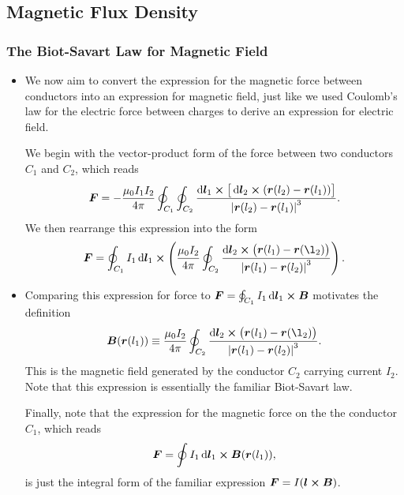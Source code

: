 \documentclass[11pt, a4paper]{article}
\newcommand{\diff}{\mathop{}\!\mathrm{d}} %
\renewcommand{\vec}[1]{\bm{#1}} %
\renewcommand{\r}{\vec{r}}
\newcommand{\B}{\vec{B}} %
\newcommand{\mm}{\mu_{0}}  %
\begin{document}
\subsection{Magnetic Flux Density}

\subsubsection{The Biot-Savart Law for Magnetic Field}
\begin{itemize}
	\item We now aim to convert the expression for the magnetic force between conductors into an expression for magnetic field, just like we used Coulomb's law for the electric force between charges to derive an expression for electric field. 
	
	We begin with the vector-product form of the force between two conductors $ C_{1} $ and $ C_{2} $, which reads
	\begin{equation*}
		\vec{F} = - \frac{\mm I_{1}I_{2}}{4\pi}\oint_{C_{1}}\oint_{C_{2}} \frac{\diff \vec{l}_{1}\cross \big[\diff \vec{l}_{2} \cross (\r(l_{2}) - \r(l_{1}) )\big]}{\abs{\r(l_{2}) - \r(l_{1})}^{3}}.
	\end{equation*}
    We then rearrange this expression into the form
	\begin{equation*}
		\vec{F} = \oint_{C_{1}}I_{1}\diff \vec{l}_{1}\cross \left(\frac{\mm I_{2}}{4\pi} \oint_{C_{2}}\frac{\diff \vec{l}_{2} \cross \big(\r(l_{1}) - \r(\l_{2})\big)}{\abs{\r(l_{1}) - \r(l_{2})}^{3}}\right).
	\end{equation*}
	
    \item Comparing this expression for force to $ \vec{F} = \oint_{C_{1}} I_{1} \diff \vec{l}_{1} \cross \B $ motivates the definition
	\begin{equation*}
		\B(\r(l_{1})) \equiv \frac{\mm I_{2}}{4\pi} \oint_{C_{2}}\frac{\diff \vec{l}_{2} \cross \big(\r(l_{1}) - \r(\l_{2})\big)}{\abs{\r(l_{1}) - \r(l_{2})}^{3}}.
	\end{equation*}
	This is the magnetic field generated by the conductor $ C_{2} $ carrying current $ I_{2} $. Note that this expression is essentially the familiar Biot-Savart law. 

    Finally, note that the expression for the magnetic force on the the conductor $ C_{1} $, which reads
	\begin{equation*}
		\vec{F} = \oint I_{1}\diff \vec{l}_{1} \cross \B(\r(l_{1})),
	\end{equation*}
	is just the integral form of the familiar expression $ \vec{F} = I (\vec{l}\cross \vec{B}) $. 
	

\end{itemize}
\end{document}
